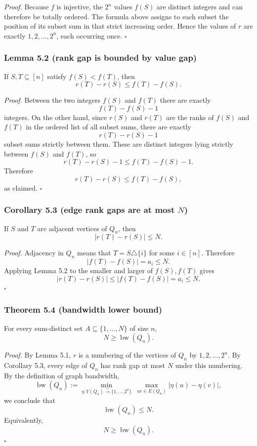 \emph{Proof.}
Because $f$ is injective, the $2^n$ values $f(S)$ are distinct integers and can therefore be totally ordered. The formula above assigns to each subset the position of its subset sum in that strict increasing order. Hence the values of $r$ are exactly $1,2,\dots,2^n$, each occurring once. \hfill$\square$

\subsubsection*{Lemma 5.2 (rank gap is bounded by value gap)}
If $S,T\subseteq [n]$ satisfy $f(S)<f(T)$, then
\[
r(T)-r(S)\le f(T)-f(S).
\]

\emph{Proof.}
Between the two integers $f(S)$ and $f(T)$ there are exactly
\[
f(T)-f(S)-1
\]
integers. On the other hand, since $r(S)$ and $r(T)$ are the ranks of $f(S)$ and $f(T)$ in the ordered list of all subset sums, there are exactly
\[
r(T)-r(S)-1
\]
subset sums strictly between them. These are distinct integers lying strictly between $f(S)$ and $f(T)$, so
\[
r(T)-r(S)-1\le f(T)-f(S)-1.
\]
Therefore
\[
r(T)-r(S)\le f(T)-f(S),
\]
as claimed. \hfill$\square$

\subsubsection*{Corollary 5.3 (edge rank gaps are at most $N$)}
If $S$ and $T$ are adjacent vertices of $Q_n$, then
\[
|r(T)-r(S)|\le N.
\]

\emph{Proof.}
Adjacency in $Q_n$ means that $T=S\triangle\{i\}$ for some $i\in[n]$. Therefore
\[
|f(T)-f(S)|=a_i\le N.
\]
Applying Lemma 5.2 to the smaller and larger of $f(S),f(T)$ gives
\[
|r(T)-r(S)|\le |f(T)-f(S)|=a_i\le N.
\]
\hfill$\square$

\subsubsection*{Theorem 5.4 (bandwidth lower bound)}
For every sum-distinct set $A\subseteq \{1,\dots,N\}$ of size $n$,
\[
N\ge \operatorname{bw}(Q_n).
\]

\emph{Proof.}
By Lemma 5.1, $r$ is a numbering of the vertices of $Q_n$ by $1,2,\dots,2^n$. By Corollary 5.3, every edge of $Q_n$ has rank gap at most $N$ under this numbering. By the definition of graph bandwidth,
\[
\operatorname{bw}(Q_n):=\min_{\eta:V(Q_n)\overset{\sim}{\to}\{1,\dots,2^n\}}\ \max_{uv\in E(Q_n)} |\eta(u)-\eta(v)|,
\]
we conclude that
\[
\operatorname{bw}(Q_n)\le N.
\]
Equivalently,
\[
N\ge \operatorname{bw}(Q_n).
\]
\hfill$\square$

